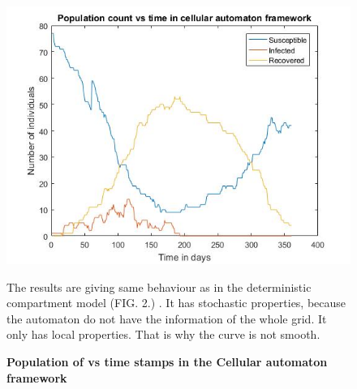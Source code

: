 \documentclass[prl,12pt,citeautoscript,reprint]{revtex4-1}
\begin{document}
\begin{figure}[H]
\begin{center}
\includegraphics[scale=0.33]{im2}
\begin{minipage}{0.45\textwidth} 
{\footnotesize The results are giving same behaviour as in the deterministic compartment model (FIG. 2.) . It has stochastic properties, because the automaton do not have the information of the whole grid. It only has local properties. That is why the curve is not smooth. 
\par}
\end{minipage}
 \caption{\textbf{Population of vs time stamps in the Cellular automaton framework}}
  \label{fig:bn}
\end{center}
\end{figure}
\end{document}
